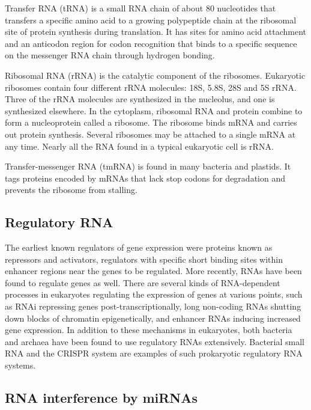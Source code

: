 Transfer RNA (tRNA) is a small RNA chain of about 80 nucleotides that transfers a specific amino acid to a growing polypeptide chain at the ribosomal site of protein synthesis during translation. It has sites for amino acid attachment and an anticodon region for codon recognition that binds to a specific sequence on the messenger RNA chain through hydrogen bonding.

Ribosomal RNA (rRNA) is the catalytic component of the ribosomes. Eukaryotic ribosomes contain four different rRNA molecules: 18S, 5.8S, 28S and 5S rRNA. Three of the rRNA molecules are synthesized in the nucleolus, and one is synthesized elsewhere. In the cytoplasm, ribosomal RNA and protein combine to form a nucleoprotein called a ribosome. The ribosome binds mRNA and carries out protein synthesis. Several ribosomes may be attached to a single mRNA at any time. Nearly all the RNA found in a typical eukaryotic cell is rRNA.

Transfer-messenger RNA (tmRNA) is found in many bacteria and plastids. It tags proteins encoded by mRNAs that lack stop codons for degradation and prevents the ribosome from stalling.

\hypertarget{regulatory-rna}{%
\subsection{Regulatory RNA}\label{regulatory-rna}}

The earliest known regulators of gene expression were proteins known as repressors and activators, regulators with specific short binding sites within enhancer regions near the genes to be regulated. More recently, RNAs have been found to regulate genes as well. There are several kinds of RNA-dependent processes in eukaryotes regulating the expression of genes at various points, such as RNAi repressing genes post-transcriptionally, long non-coding RNAs shutting down blocks of chromatin epigenetically, and enhancer RNAs inducing increased gene expression. In addition to these mechanisms in eukaryotes, both bacteria and archaea have been found to use regulatory RNAs extensively. Bacterial small RNA and the CRISPR system are examples of such prokaryotic regulatory RNA systems.

\hypertarget{rna-interference-by-mirnas}{%
\subsection{RNA interference by miRNAs}\label{rna-interference-by-mirnas}}

